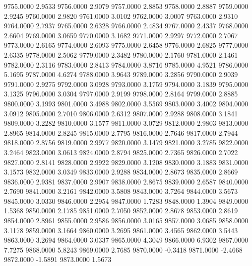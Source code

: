 9755.0000      2.9533
9756.0000      2.9079
9757.0000      2.8853
9758.0000      2.8887
9759.0000      2.9245
9760.0000      2.9820
9761.0000      3.0102
9762.0000      3.0007
9763.0000      2.9310
9764.0000      2.7937
9765.0000      2.6328
9766.0000      2.4834
9767.0000      2.4337
9768.0000      2.6604
9769.0000      3.0659
9770.0000      3.1682
9771.0000      2.9297
9772.0000      2.7067
9773.0000      2.6165
9774.0000      2.6093
9775.0000      2.6458
9776.0000      2.6825
9777.0000      2.6335
9778.0000      2.5062
9779.0000      2.3482
9780.0000      2.1760
9781.0000      2.1461
9782.0000      2.3116
9783.0000      2.8413
9784.0000      3.8716
9785.0000      4.9521
9786.0000      5.1695
9787.0000      4.6274
9788.0000      3.9643
9789.0000      3.2856
9790.0000      2.9039
9791.0000      2.9275
9792.0000      3.0928
9793.0000      3.1759
9794.0000      3.1839
9795.0000      3.1325
9796.0000      3.0304
9797.0000      2.9199
9798.0000      2.8164
9799.0000      2.8885
9800.0000      3.1993
9801.0000      3.4988
9802.0000      3.5569
9803.0000      3.4002
9804.0000      3.0912
9805.0000      2.7010
9806.0000      2.6312
9807.0000      2.9288
9808.0000      3.1841
9809.0000      3.2282
9810.0000      3.1577
9811.0000      3.0729
9812.0000      2.9803
9813.0000      2.8965
9814.0000      2.8245
9815.0000      2.7795
9816.0000      2.7646
9817.0000      2.7944
9818.0000      2.8756
9819.0000      2.9977
9820.0000      3.1479
9821.0000      3.2785
9822.0000      3.2464
9823.0000      3.0613
9824.0000      2.8794
9825.0000      2.7365
9826.0000      2.7022
9827.0000      2.8141
9828.0000      2.9922
9829.0000      3.1208
9830.0000      3.1883
9831.0000      3.1573
9832.0000      3.0349
9833.0000      2.9288
9834.0000      2.8673
9835.0000      2.8669
9836.0000      2.9381
9837.0000      2.9907
9838.0000      2.8675
9839.0000      2.6587
9840.0000      2.7690
9841.0000      3.2161
9842.0000      3.5808
9843.0000      3.7264
9844.0000      3.5673
9845.0000      3.0330
9846.0000      2.2954
9847.0000      1.7283
9848.0000      1.3904
9849.0000      1.5368
9850.0000      2.1785
9851.0000      2.7050
9852.0000      2.8678
9853.0000      2.8619
9854.0000      2.8961
9855.0000      2.9586
9856.0000      3.0165
9857.0000      3.0685
9858.0000      3.1178
9859.0000      3.1664
9860.0000      3.2695
9861.0000      3.4565
9862.0000      3.5443
9863.0000      3.2694
9864.0000      3.0337
9865.0000      4.3049
9866.0000      6.9302
9867.0000      7.7275
9868.0000      5.8243
9869.0000      2.7685
9870.0000     -0.3418
9871.0000     -2.4668
9872.0000     -1.5891
9873.0000      1.5673
